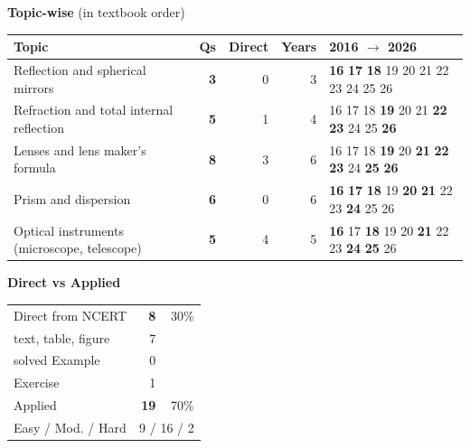 {\small\textbf{\color{crimson}Topic-wise} (in textbook order)\par\smallskip
\begin{tabularx}{\linewidth}{@{}>{\raggedright\arraybackslash}Xrrrl@{}}\toprule
Topic & Qs & Direct & Years & 2016 $\rightarrow$ 2026\\\midrule
Reflection and spherical mirrors & \textbf{3} & 0 & 3 & {\scriptsize \textbf{16} \textbf{17} \textbf{18} {\color{gray!45}19} {\color{gray!45}20} {\color{gray!45}21} {\color{gray!45}22} {\color{gray!45}23} {\color{gray!45}24} {\color{gray!45}25} {\color{gray!45}26}}\\
Refraction and total internal reflection & \textbf{5} & 1 & 4 & {\scriptsize {\color{gray!45}16} {\color{gray!45}17} {\color{gray!45}18} \textbf{19} {\color{gray!45}20} {\color{gray!45}21} \textbf{22} \textbf{23} {\color{gray!45}24} {\color{gray!45}25} \textbf{26}}\\
Lenses and lens maker's formula & \textbf{8} & 3 & 6 & {\scriptsize {\color{gray!45}16} {\color{gray!45}17} {\color{gray!45}18} \textbf{19} {\color{gray!45}20} \textbf{21} \textbf{22} \textbf{23} {\color{gray!45}24} \textbf{25} \textbf{26}}\\
Prism and dispersion & \textbf{6} & 0 & 6 & {\scriptsize \textbf{16} \textbf{17} \textbf{18} {\color{gray!45}19} \textbf{20} \textbf{21} {\color{gray!45}22} {\color{gray!45}23} \textbf{24} {\color{gray!45}25} {\color{gray!45}26}}\\
Optical instruments (microscope, telescope) & \textbf{5} & 4 & 5 & {\scriptsize \textbf{16} {\color{gray!45}17} \textbf{18} {\color{gray!45}19} {\color{gray!45}20} \textbf{21} {\color{gray!45}22} {\color{gray!45}23} \textbf{24} \textbf{25} {\color{gray!45}26}}\\
\bottomrule\end{tabularx}}\par\medskip
\begin{minipage}[t]{0.34\linewidth}{\small\textbf{\color{crimson}Direct vs Applied}\par\smallskip
\begin{tabular}{@{}lrr@{}}\toprule
Direct from NCERT & \textbf{8} & 30\%\\
\quad text, table, figure & 7 &\\
\quad solved Example & 0 &\\
\quad Exercise & 1 &\\
Applied & \textbf{19} & 70\%\\\midrule
Easy / Mod. / Hard & \multicolumn{2}{r}{9 / 16 / 2}\\\bottomrule
\end{tabular}}\end{minipage}\hfill
